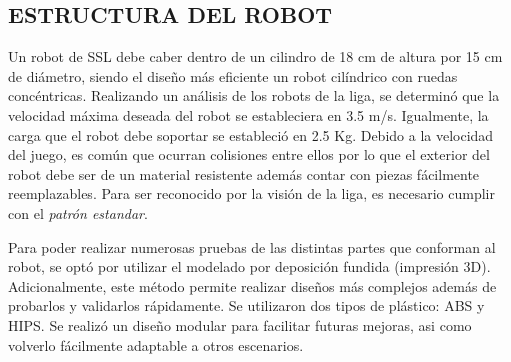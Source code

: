 \documentclass[twocolumn,10pt]{amrob}
\begin{document}
\subsection*{ESTRUCTURA DEL ROBOT}
Un robot de SSL debe caber dentro de un cilindro de 18 cm de altura por 15 cm de diámetro, siendo el diseño más eficiente un robot cilíndrico con ruedas concéntricas.
Realizando un análisis de los robots de la liga, se determinó que la velocidad máxima deseada del robot se estableciera en 3.5 m/s. Igualmente, la carga que el robot debe soportar se estableció en 2.5 Kg. Debido a la velocidad del juego, es común que ocurran colisiones entre ellos por lo que el exterior del robot debe ser de un material resistente además contar con piezas fácilmente reemplazables. Para ser reconocido por la visión de la liga, es necesario cumplir con el \textit{patrón estandar}. \par
Para poder realizar numerosas pruebas de las distintas partes que conforman al robot, se optó por utilizar el modelado por deposición fundida (impresión 3D). Adicionalmente, este método permite realizar diseños más complejos además de probarlos y validarlos rápidamente. Se utilizaron dos tipos de plástico: ABS y HIPS. Se realizó un diseño modular para facilitar futuras mejoras, asi como volverlo fácilmente adaptable a otros escenarios.\par
\end{document}

